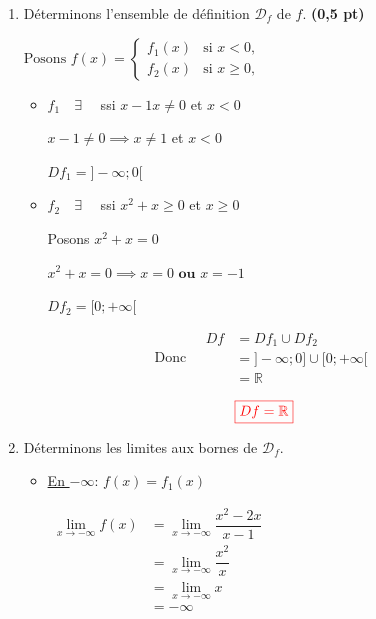 \documentclass[12pt,a4paper]{article}
\begin{document}
\begin{enumerate}
    \item Déterminons l'ensemble de définition $\mathcal{D}_f$ de $f$. \hspace{1cm} \textbf{(0,5 pt)}

\(
\text{Posons }f(x)=
\begin{cases}
f_{1}(x) & \text{si } x<0,\\[4mm]
f_{2}(x) & \text{si } x\ge 0,
\end{cases}
\)    

\begin{itemize}
\item $ f_{1} \quad \exists \quad$ ssi  $x - 1x \neq 0 $ et $x<0$
		    
		    $x - 1 \neq 0 \implies x \neq 1$ et $x<0$

        \underline{$Df_{1} = ]-\infty ; 0[$}
\item $ f_{2} \quad \exists \quad$ ssi  $x^2 + x \geq 0 $ et $x\ge 0$

Posons $x^2 + x = 0 $

$x^2 + x = 0  \implies x=0 \textbf{ ou } x=-1$       
   
    
    \underline{$Df_{2} = [0 ; +\infty[$}     
\end{itemize}

$$ \text{Donc}\quad
\begin{aligned}
Df & = Df_{1} \cup Df_{2} \\
    & = ]-\infty ; 0] \cup [0 ; +\infty[\\
    &=\mathbb{R} 
\end{aligned}
$$
    
    $$ \textcolor{red}{ \boxed{Df = \mathbb{R}} }$$
  
    \item Déterminons les limites aux bornes de $\mathcal{D}_f$. 

\begin{itemize}
\item \underline{En $-\infty$}: $f(x)=f_{1}(x)$   
    
\(
\begin{aligned}
 \lim\limits_{x \to -\infty} f(x) &= \lim\limits_{x \to -\infty} \dfrac{x^2-2x}{x-1}\\
 																	&= \lim\limits_{x \to -\infty} \dfrac{x^2}{x}\\
 																	&= \lim\limits_{x \to -\infty} x\\
 																	&= -\infty
\end{aligned}    
\)


\end{itemize}
\end{enumerate}
\end{document}
